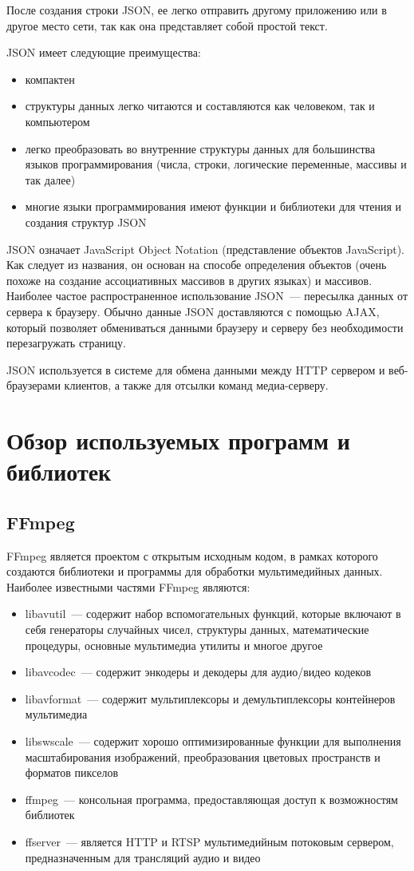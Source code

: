После создания строки JSON, ее легко отправить другому приложению или в другое место сети,
так как она представляет собой простой текст.

\medskip
JSON имеет следующие преимущества:
\smallskip
\begin{itemize}
	\item  компактен
	\item структуры данных легко читаются и составляются как человеком, так и компьютером
	\item легко преобразовать во внутренние структуры данных для большинства языков программирования
	(числа, строки, логические переменные, массивы и так далее)
	\item многие языки программирования имеют функции и библиотеки для чтения и создания структур JSON
\end{itemize}

JSON означает JavaScript Object Notation (представление объектов JavaScript). Как следует из названия,
он основан на способе определения объектов (очень похоже на создание ассоциативных массивов в других
языках) и массивов.
Наиболее частое распространенное использование JSON~--- пересылка данных от сервера к браузеру. Обычно
данные JSON доставляются с помощью AJAX, который позволяет обмениваться данными браузеру и серверу без
необходимости перезагружать страницу.

JSON используется в системе для обмена данными между HTTP сервером и веб-браузерами клиентов,
а также для отсылки команд медиа-серверу.

\section{Обзор используемых программ и библиотек}

\subsection{FFmpeg}
FFmpeg является проектом с открытым исходным кодом, в рамках которого создаются библиотеки и
программы для обработки мультимедийных данных.
Наиболее известными частями FFmpeg являются:
\smallskip
\begin{itemize}
	\item
	libavutil~--- содержит набор вспомогательных функций, которые включают в себя генераторы
	случайных чисел, структуры данных, математические процедуры, основные мультимедиа утилиты
	и многое другое
	\item
	libavcodec~--- содержит энкодеры и декодеры для аудио/видео кодеков
	\item
	libavformat~--- содержит мультиплексоры и демультиплексоры контейнеров мультимедиа
	\item
	libswscale~--- содержит хорошо оптимизированные функции для выполнения масштабирования
	изображений, преобразования цветовых пространств и форматов пикселов
	\item
	ffmpeg~--- консольная программа, предоставляющая доступ к возможностям библиотек
	\item
	ffserver~--- является HTTP и RTSP мультимедийным потоковым сервером, предназначенным
	для трансляций аудио и видео
\end{itemize}

